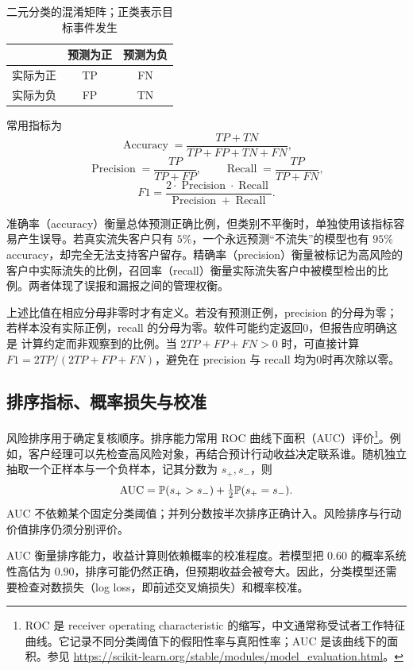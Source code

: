 \begin{table}[htbp]
\centering
\caption{二元分类的混淆矩阵；正类表示目标事件发生}
\begin{tabular}{lcc}
\toprule
\rowcolor{BDMTableHead}
 & 预测为正 & 预测为负\\
\midrule
实际为正 & TP & FN\\
实际为负 & FP & TN\\
\bottomrule
\end{tabular}
\end{table}

常用指标为
\[
  \operatorname{Accuracy}=\frac{TP+TN}{TP+FP+TN+FN},
\]
\[
  \operatorname{Precision}=\frac{TP}{TP+FP},
  \qquad
  \operatorname{Recall}=\frac{TP}{TP+FN},
\]
\[
  F1=
  \frac{2\cdot \operatorname{Precision}\cdot \operatorname{Recall}}
       {\operatorname{Precision}+\operatorname{Recall}}.
\]

准确率（accuracy）衡量总体预测正确比例，但类别不平衡时，单独使用该指标容易产生误导。若真实流失客户只有 \(5\%\)，一个永远预测“不流失”的模型也有 \(95\%\) accuracy，却完全无法支持客户留存。精确率（precision）衡量被标记为高风险的客户中实际流失的比例，召回率（recall）衡量实际流失客户中被模型检出的比例。两者体现了误报和漏报之间的管理权衡。

上述比值在相应分母非零时才有定义。若没有预测正例，precision 的分母为零；
若样本没有实际正例，recall 的分母为零。软件可能约定返回0，但报告应明确这是
计算约定而非观察到的比例。当 \(2TP+FP+FN>0\) 时，可直接计算
\(F1=2TP/(2TP+FP+FN)\)，避免在 precision 与 recall 均为0时再次除以零。

\subsection{排序指标、概率损失与校准}

风险排序用于确定复核顺序。排序能力常用 ROC 曲线下面积（AUC）评价\footnote{ROC 是 receiver operating characteristic 的缩写，中文通常称受试者工作特征曲线。它记录不同分类阈值下的假阳性率与真阳性率；AUC 是该曲线下的面积。参见 \url{https://scikit-learn.org/stable/modules/model_evaluation.html}。}。例如，客户经理可以先检查高风险对象，再结合预计行动收益决定联系谁。随机独立抽取一个正样本与一个负样本，记其分数为 \(s_+,s_-\)，则
\[
\mathrm{AUC}=\mathbb P(s_+>s_-)+\tfrac12\mathbb P(s_+=s_-).
\]
AUC 不依赖某个固定分类阈值；并列分数按半次排序正确计入。风险排序与行动价值排序仍须分别评价。

AUC 衡量排序能力，收益计算则依赖概率的校准程度。若模型把 \(0.60\) 的概率系统性高估为 \(0.90\)，排序可能仍然正确，但预期收益会被夸大。因此，分类模型还需要检查对数损失（log loss，即前述交叉熵损失）和概率校准。

